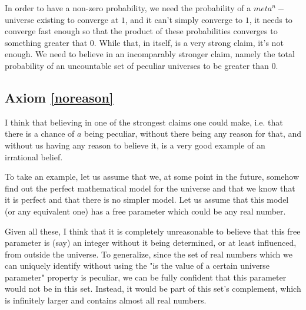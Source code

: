 \documentclass[a4paper
,draft
]{article}
\begin{document}
In order to have a non-zero probability, we need the probability of a $meta^n-$universe existing to converge at $1$, and it can't simply converge to $1$, it needs to converge fast enough so that the product of these probabilities converges to something greater that $0$. While that, in itself, is a very strong claim, it's not enough. We need to believe in an incomparably stronger claim, namely the total probability of an uncountable set of peculiar universes to be greater than $0$.

\subsection{Axiom \ref{noreason}}

I think that believing in one of the strongest claims one could make, i.e. that there is a chance of $a$ being peculiar, without there being any reason for that, and without us having any reason to believe it, is a very good example of an irrational belief.

To take an example, let us assume that we, at some point in the future, somehow find out the perfect mathematical model for the universe and that we know that it is perfect and that there is no simpler model. Let us assume that this model (or any equivalent one) has a free parameter which could be any real number.

Given all these, I think that it is completely unreasonable to believe that this free parameter is (say) an integer without it being determined, or at least influenced, from outside the universe. To generalize, since the set of real numbers which we can uniquely identify without using the "is the value of a certain universe parameter" property is peculiar, we can be fully confident that this parameter would not be in this set. Instead, it would be part of this set's complement, which is infinitely larger and contains almost all real numbers.


\end{document}
